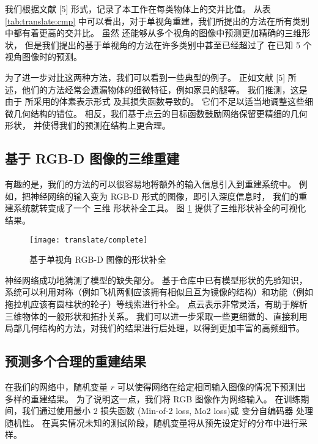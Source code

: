 我们根据文献 [5] 形式，记录了本工作在每类物体上的交并比值。 从表 \ref{tab:translate:cmp} 中可以看出，对于单视角重建，我们所提出的方法在所有类别中都有着更高的交并比。
虽然 \threedrsns 还能够从多个视角的图像中预测更加精确的三维形状，
但是我们提出的基于单视角的方法在许多类别中甚至已经超过了 \threedrsns 在已知 5 个视角图像时的预测。

为了进一步对比这两种方法，我们可以看到一些典型的例子。 正如文献 [5] 所述，他们的方法经常会遗漏物体的细微特征，例如家具的腿等。
我们推测，这是由于 \threedrsns 所采用的体素表示形式
及其损失函数导致的。
它们不足以适当地调整这些细微几何结构的错位。
相反，我们基于点云的目标函数鼓励网络保留更精细的几何形状，
并使得我们的预测在结构上更合理。




\subsection{基于 RGB-D 图像的三维重建}

有趣的是，我们的方法的可以很容易地将额外的输入信息引入到重建系统中。 例如，把神经网络的输入变为 RGB-D 形式的图像，即引入深度信息时，
我们的重建系统就转变成了一个 三维 形状补全工具。 图 \ref{fig:translate:complete} 提供了三维形状补全的可视化结果。


\begin{figure}[h]
	\centering
	\texttt{[image: translate/complete]}
	\caption[]{基于单视角 RGB-D 图像的形状补全}
	\label{fig:translate:complete}
\end{figure}

神经网络成功地猜测了模型的缺失部分。 %
基于仓库中已有模型形状的先验知识，
系统可以利用对称（例如飞机两侧应该拥有相似且互为镜像的结构）和功能（例如拖拉机应该有圆柱状的轮子）等线索进行补全。
点云表示非常灵活，有助于解析三维物体的一般形状和拓扑关系。
我们可以进一步采取一些更细微的、直接利用局部几何结构的方法，对我们的结果进行后处理，以得到更加丰富的高频细节。





\subsection{预测多个合理的重建结果\label{section:translate:net_multi}}

在我们的网络中，随机变量 $r$ 可以使得网络在给定相同输入图像的情况下预测出多样的重建结果。
为了说明这一点，我们将 RGB 图像作为网络输入。 在训练期间，我们通过使用最小 $2$ 损失函数 (Min-of-2 loss, Mo2 loss)或 变分自编码器 处理随机性。
在真实情况未知的测试阶段，随机变量将从预先设定好的分布中进行采样。

